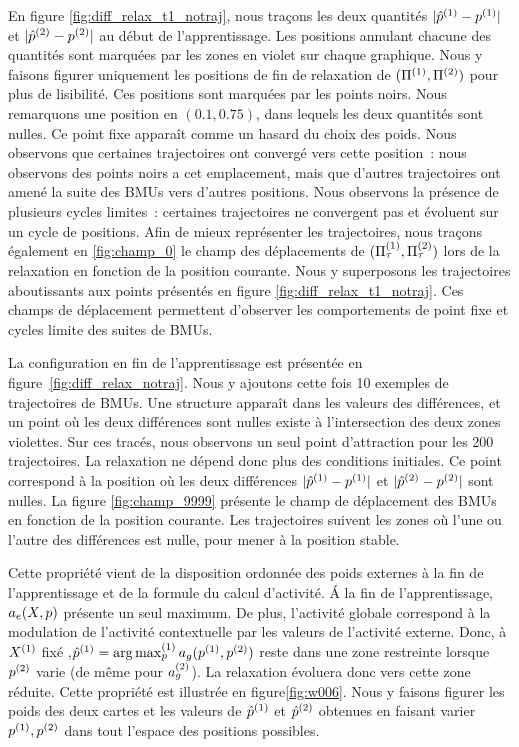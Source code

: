 \documentclass[../main]{subfiles}
\begin{document}
En figure \ref{fig:diff_relax_t1_notraj}, nous traçons les deux quantités $\lvert \hat{p}^{({1})} - p^{({1})} \rvert$ et $\lvert \hat{p}^{({2})} - p^{({2})}\rvert$ au début de l'apprentissage. Les positions annulant chacune des quantités sont marquées par les zones en violet sur chaque graphique.
Nous y faisons figurer uniquement les positions de fin de relaxation de $(\Pi^{({1})},\Pi^{({2})})$ pour plus de lisibilité. Ces positions sont marquées par les points noirs.
Nous remarquons une position en $(0.1, 0.75)$, dans lequels les deux quantités sont nulles. Ce point fixe apparaît comme un hasard du choix des poids.
Nous observons que certaines trajectoires ont convergé vers cette position~: nous observons des points noirs a cet emplacement, mais que d'autres trajectoires ont amené la suite des BMUs vers d'autres positions.
Nous observons la présence de plusieurs cycles limites~: certaines trajectoires ne convergent pas et évoluent sur un cycle de positions.
Afin de mieux représenter les trajectoires, nous traçons également en \ref{fig:champ_0} le champ des déplacements de $(\Pi^{({1})}_\tau,\Pi^{({2})}_\tau)$ lors de la relaxation en fonction de la position courante. 
Nous y superposons les trajectoires aboutissants aux points présentés en figure \ref{fig:diff_relax_t1_notraj}.
Ces champs de déplacement permettent d'observer les comportements de point fixe et cycles limite des suites de BMUs.

La configuration en fin de l'apprentissage est présentée en figure~\ref{fig:diff_relax_notraj}. Nous y ajoutons cette fois 10 exemples de trajectoires de BMUs.
Une structure apparaît dans les valeurs des différences, et un point où les deux différences sont nulles existe à l'intersection des deux zones violettes.
Sur ces tracés, nous observons un seul point d'attraction pour les 200 trajectoires. La relaxation ne dépend donc plus des conditions initiales.
Ce point correspond à la position où les deux différences $\lvert \hat{p}^{({1})} - p^{({1})} \rvert$ et $\lvert \hat{p}^{({2})} - p^{({2})}\rvert$ sont nulles.
La figure \ref{fig:champ_9999} présente le champ de déplacement des BMUs en fonction de la position courante. Les trajectoires suivent les zones où l'une ou l'autre des différences est nulle, pour mener à la position stable. 


Cette propriété vient de la disposition ordonnée des poids externes à la fin de l'apprentissage et de la formule du calcul d'activité.
\'A la fin de l'apprentissage, $a_e(X,p)$ présente un seul maximum. 
De plus, l'activité globale correspond à la modulation de l'activité contextuelle par les valeurs de l'activité externe. Donc, à $X^{({1})}$ fixé ,$\hat{p}^{({1})} = \operatorname*{arg\,max}_p^{({1})} a_g(p^{({1})}, p^{({2})})$ reste dans une zone restreinte lorsque $p^{({2})}$ varie (de même pour $a_g^{({2})}$). 
La relaxation évoluera donc vers cette zone réduite.
Cette propriété est illustrée en figure\ref{fig:w006}.
Nous y faisons figurer les poids des deux cartes et les valeurs de $\hat{p}^{({1})}$ et $\hat{p}^{({2})}$ obtenues en faisant varier $p^{({1})}, p^{({2})}$ dans tout l'espace des positions possibles.
\end{document}

